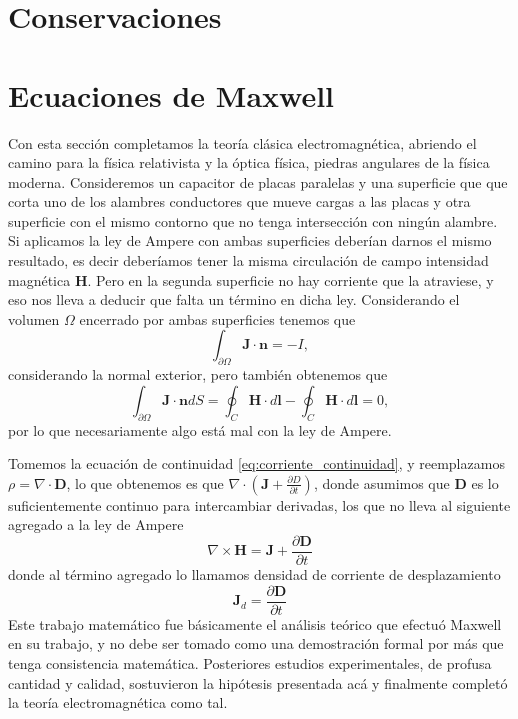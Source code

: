 \documentclass[11pt,a4paper]{article}
\numberwithin{equation}{section}
\begin{document}
\section{Conservaciones}


\section{Ecuaciones de Maxwell}
\label{sec:ec_maxwell}
Con esta sección completamos la teoría clásica electromagnética, abriendo el camino para la física relativista y la óptica física, piedras angulares de la física moderna. Consideremos un capacitor de placas paralelas y una superficie que que corta uno de los alambres conductores que mueve cargas a las placas y otra superficie con el mismo contorno que no tenga intersección con ningún alambre. Si aplicamos la ley de Ampere con ambas superficies deberían darnos el mismo resultado, es decir deberíamos tener la misma circulación de campo intensidad magnética $\textbf{H}$. Pero en la segunda superficie no hay corriente que la atraviese, y eso nos lleva a deducir que falta un término en dicha ley. Considerando el volumen $\Omega$ encerrado por ambas superficies tenemos que \[\int_{\partial \Omega} \textbf{J} \cdot \textbf{n} = - I,\] considerando la normal exterior, pero también obtenemos que \[\int_{\partial \Omega} \textbf{J} \cdot \textbf{n} dS = \oint_{C} \textbf{H} \cdot d\textbf{l} - \oint_{C} \textbf{H} \cdot d\textbf{l} = 0,\] por lo que necesariamente algo está mal con la ley de Ampere. 

Tomemos la ecuación de continuidad \ref{eq:corriente_continuidad}, y reemplazamos $\rho = \nabla \cdot \textbf{D}$, lo que obtenemos es que $\nabla \cdot \left(\textbf{J} + \frac{\partial D}{\partial t}\right)$, donde asumimos que $\textbf{D}$ es lo suficientemente continuo para intercambiar derivadas, los que no lleva al siguiente agregado a la ley de Ampere
\begin{equation}
    \nabla \times \textbf{H} = \textbf{J} + \frac{\partial \textbf{D}}{\partial t}
    \label{eq:em_ampere}
\end{equation}
donde al término agregado lo llamamos densidad de corriente de desplazamiento
\begin{equation}
    \textbf{J}_d = \frac{\partial \textbf{D}}{\partial t}
    \label{eq:em_corriente_desplazamiento}
\end{equation}
Este trabajo matemático fue básicamente el análisis teórico que efectuó Maxwell en su trabajo, y no debe ser tomado como una demostración formal por más que tenga consistencia matemática. Posteriores estudios experimentales, de profusa cantidad y calidad, sostuvieron la hipótesis presentada acá y finalmente completó la teoría electromagnética como tal. 
\end{document}
